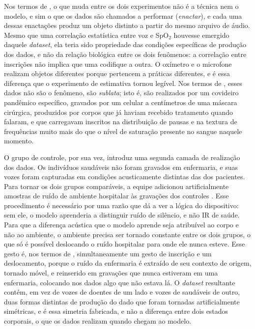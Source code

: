 Nos termos de \textcite{mol2002body}, o que muda entre os dois experimentos não é a técnica nem o modelo, e sim o que os dados são chamados a performar (\textit{enactar}), e cada uma dessas enactações produz um objeto distinto a partir do mesmo arquivo de áudio. Mesmo que uma correlação estatística entre voz e SpO$_2$ houvesse emergido daquele \textit{dataset}, ela teria sido propriedade das condições específicas de produção dos dados, e não da relação biológica entre os dois fenômenos: a correlação entre inscrições não implica que uma codifique a outra. O oxímetro e o microfone realizam objetos diferentes porque pertencem a práticas diferentes, e é essa diferença que o experimento de estimativa tornou legível. Nos termos de \textcite{Latour2017Esperanca}, esses dados não são o fenômeno, são \textit{sublata}; isto é, são realizados por um covideiro pandêmico específico, gravados por um celular a centímetros de uma máscara cirúrgica, produzidos por corpos que já haviam recebido tratamento quando falaram, e que carregavam inscritos na distribuição de pausas e na textura de frequências muito mais do que o nível de saturação presente no sangue naquele momento.

O grupo de controle, por sua vez, introduz uma segunda camada de realização dos dados. Os indivíduos saudáveis não foram gravados em enfermaria, e suas vozes foram capturadas em condições acusticamente distintas das dos pacientes. Para tornar os dois grupos comparáveis, a equipe adicionou artificialmente amostras de ruído de ambiente hospitalar às gravações dos controles \parencite{Casanova2021DeepLearning}. Esse procedimento é necessário por uma razão que dá a ver a lógica do dispositivo: sem ele, o modelo aprenderia a distinguir ruído de silêncio, e não IR de saúde. Para que a diferença acústica que o modelo aprende seja atribuível ao corpo e não ao ambiente, o ambiente precisa ser tornado constante entre os dois grupos, o que só é possível deslocando o ruído hospitalar para onde ele nunca esteve. Esse gesto é, nos termos de \textcite{Latour2017Esperanca}, simultaneamente um gesto de inscrição e um deslocamento, porque o ruído da enfermaria é extraído de seu contexto de origem, tornado móvel, e reinserido em gravações que nunca estiveram em uma enfermaria, colocando nos dados algo que não estava lá. O \textit{dataset} resultante contém, em vez de vozes de doentes de um lado e vozes de saudáveis de outro, duas formas distintas de produção do dado que foram tornadas artificialmente simétricas, e é essa simetria fabricada, e não a diferença entre dois estados corporais, o que os dados realizam quando chegam ao modelo.

